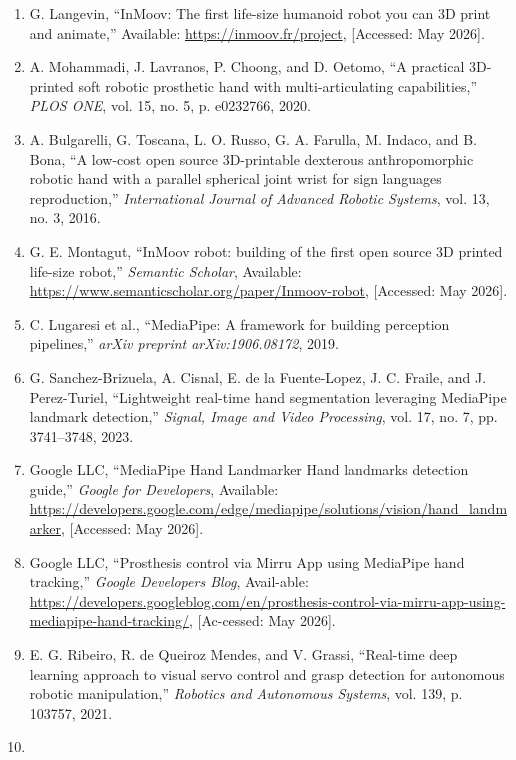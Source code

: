 \documentclass[12pt,a4paper,oneside]{report}
\begin{document}
\begin{enumerate}
\def\labelenumi{\arabic{enumi}.}
\item
  G. Langevin, ``InMoov: The first life-size humanoid robot you can 3D
  print and animate,'' Available:
  \url{https://inmoov.fr/project}, {[}Accessed: May 2026{]}.
\item
  A. Mohammadi, J. Lavranos, P. Choong, and D. Oetomo, ``A practical
  3D-printed soft robotic prosthetic hand with multi-articulating
  capabilities,'' \emph{PLOS ONE}, vol. 15, no. 5, p. e0232766, 2020.
\item
  A. Bulgarelli, G. Toscana, L. O. Russo, G. A. Farulla, M. Indaco, and
  B. Bona, ``A low-cost open source 3D-printable dexterous
  anthropomorphic robotic hand with a parallel spherical joint wrist for
  sign languages reproduction,'' \emph{International Journal of Advanced
  Robotic Systems}, vol. 13, no. 3, 2016.
\item
  G. E. Montagut, ``InMoov robot: building of the first open source 3D
  printed life-size robot,'' \emph{Semantic Scholar}, Available:
  \url{https://www.semanticscholar.org/paper/Inmoov-robot}, {[}Accessed:
  May 2026{]}.
\item
  C. Lugaresi et al., ``MediaPipe: A framework for building perception
  pipelines,'' \emph{arXiv preprint arXiv:1906.08172}, 2019.
\item
  G. Sanchez-Brizuela, A. Cisnal, E. de la Fuente-Lopez, J. C. Fraile,
  and J. Perez-Turiel, ``Lightweight real-time hand segmentation
  leveraging MediaPipe landmark detection,'' \emph{Signal, Image and
  Video Processing}, vol. 17, no. 7, pp. 3741--3748, 2023.
\item
  Google LLC, ``MediaPipe Hand Landmarker Hand landmarks detection
  guide,'' \emph{Google for Developers}, Available:
  \url{https://developers.google.com/edge/mediapipe/solutions/vision/hand_landmarker},
  {[}Accessed: May 2026{]}.
\item
  Google LLC, ``Prosthesis control via Mirru App using MediaPipe hand
  tracking,'' \emph{Google Developers Blog}, Avail-able:
  \url{https://developers.googleblog.com/en/prosthesis-control-via-mirru-app-using-mediapipe-hand-tracking/},
  {[}Ac-cessed: May 2026{]}.
\item
  E. G. Ribeiro, R. de Queiroz Mendes, and V. Grassi, ``Real-time deep
  learning approach to visual servo control and grasp detection for
  autonomous robotic manipulation,'' \emph{Robotics and Autonomous
  Systems}, vol. 139, p. 103757, 2021.
\item

\end{enumerate}
\end{document}
